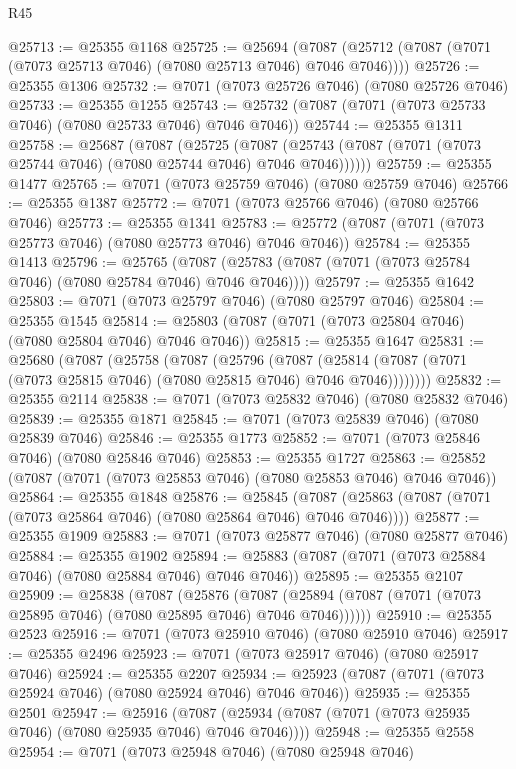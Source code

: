 \begin{lexlean}{R45}
\begin{coremodule}
{@25713 := @25355 @1168
@25725 := @25694
    (@7087 (@25712 (@7087 (@7071 (@7073 @25713 @7046) (@7080 @25713 @7046) @7046 @7046))))
@25726 := @25355 @1306
@25732 := @7071 (@7073 @25726 @7046) (@7080 @25726 @7046)
@25733 := @25355 @1255
@25743 := @25732 (@7087 (@7071 (@7073 @25733 @7046) (@7080 @25733 @7046) @7046 @7046))
@25744 := @25355 @1311
@25758 := @25687
    (@7087
      (@25725
        (@7087 (@25743 (@7087 (@7071 (@7073 @25744 @7046) (@7080 @25744 @7046) @7046 @7046))))))
@25759 := @25355 @1477
@25765 := @7071 (@7073 @25759 @7046) (@7080 @25759 @7046)
@25766 := @25355 @1387
@25772 := @7071 (@7073 @25766 @7046) (@7080 @25766 @7046)
@25773 := @25355 @1341
@25783 := @25772 (@7087 (@7071 (@7073 @25773 @7046) (@7080 @25773 @7046) @7046 @7046))
@25784 := @25355 @1413
@25796 := @25765
    (@7087 (@25783 (@7087 (@7071 (@7073 @25784 @7046) (@7080 @25784 @7046) @7046 @7046))))
@25797 := @25355 @1642
@25803 := @7071 (@7073 @25797 @7046) (@7080 @25797 @7046)
@25804 := @25355 @1545
@25814 := @25803 (@7087 (@7071 (@7073 @25804 @7046) (@7080 @25804 @7046) @7046 @7046))
@25815 := @25355 @1647
@25831 := @25680
    (@7087
      (@25758
        (@7087
          (@25796
            (@7087
              (@25814 (@7087 (@7071 (@7073 @25815 @7046) (@7080 @25815 @7046) @7046 @7046))))))))
@25832 := @25355 @2114
@25838 := @7071 (@7073 @25832 @7046) (@7080 @25832 @7046)
@25839 := @25355 @1871
@25845 := @7071 (@7073 @25839 @7046) (@7080 @25839 @7046)
@25846 := @25355 @1773
@25852 := @7071 (@7073 @25846 @7046) (@7080 @25846 @7046)
@25853 := @25355 @1727
@25863 := @25852 (@7087 (@7071 (@7073 @25853 @7046) (@7080 @25853 @7046) @7046 @7046))
@25864 := @25355 @1848
@25876 := @25845
    (@7087 (@25863 (@7087 (@7071 (@7073 @25864 @7046) (@7080 @25864 @7046) @7046 @7046))))
@25877 := @25355 @1909
@25883 := @7071 (@7073 @25877 @7046) (@7080 @25877 @7046)
@25884 := @25355 @1902
@25894 := @25883 (@7087 (@7071 (@7073 @25884 @7046) (@7080 @25884 @7046) @7046 @7046))
@25895 := @25355 @2107
@25909 := @25838
    (@7087
      (@25876
        (@7087 (@25894 (@7087 (@7071 (@7073 @25895 @7046) (@7080 @25895 @7046) @7046 @7046))))))
@25910 := @25355 @2523
@25916 := @7071 (@7073 @25910 @7046) (@7080 @25910 @7046)
@25917 := @25355 @2496
@25923 := @7071 (@7073 @25917 @7046) (@7080 @25917 @7046)
@25924 := @25355 @2207
@25934 := @25923 (@7087 (@7071 (@7073 @25924 @7046) (@7080 @25924 @7046) @7046 @7046))
@25935 := @25355 @2501
@25947 := @25916
    (@7087 (@25934 (@7087 (@7071 (@7073 @25935 @7046) (@7080 @25935 @7046) @7046 @7046))))
@25948 := @25355 @2558
@25954 := @7071 (@7073 @25948 @7046) (@7080 @25948 @7046)
}
\end{coremodule}
\end{lexlean}
